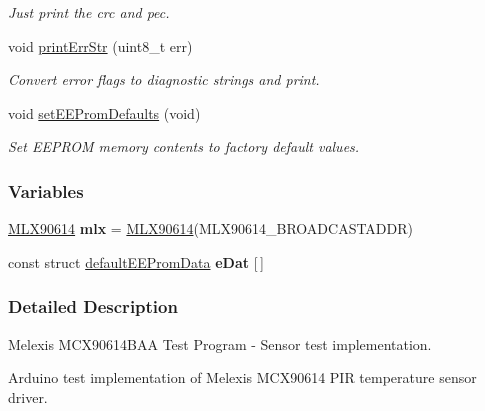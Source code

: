 \begin{DoxyCompactItemize}
\begin{DoxyCompactList}\small\item\em Just print the crc and pec. \end{DoxyCompactList}\item 
void \mbox{\hyperlink{_melexis_test_8ino_a47075beca8233f9f8e9614f4fb6eabd1}{print\+Err\+Str}} (uint8\+\_\+t err)
\begin{DoxyCompactList}\small\item\em Convert error flags to diagnostic strings and print. \end{DoxyCompactList}\item 
void \mbox{\hyperlink{_melexis_test_8ino_a5662aecfa23cb7ad365b8246e928c843}{set\+E\+E\+Prom\+Defaults}} (void)
\begin{DoxyCompactList}\small\item\em Set E\+E\+P\+R\+OM memory contents to factory default values. \end{DoxyCompactList}\end{DoxyCompactItemize}
\subsubsection*{Variables}
\begin{DoxyCompactItemize}
\item 
\mbox{\label{_melexis_test_8ino_af12b22cf7e5666147279557c9b55db66}} 
\mbox{\hyperlink{class_m_l_x90614}{M\+L\+X90614}} {\bfseries mlx} = \mbox{\hyperlink{class_m_l_x90614}{M\+L\+X90614}}(M\+L\+X90614\+\_\+\+B\+R\+O\+A\+D\+C\+A\+S\+T\+A\+D\+DR)
\item 
const struct \mbox{\hyperlink{structdefault_e_e_prom_data}{default\+E\+E\+Prom\+Data}} {\bfseries e\+Dat} \mbox{[}$\,$\mbox{]}
\end{DoxyCompactItemize}


\subsubsection{Detailed Description}
Melexis M\+C\+X90614\+B\+AA Test Program -\/ Sensor test implementation. ~\newline
 

Arduino test implementation of Melexis M\+C\+X90614 P\+IR temperature sensor driver.

